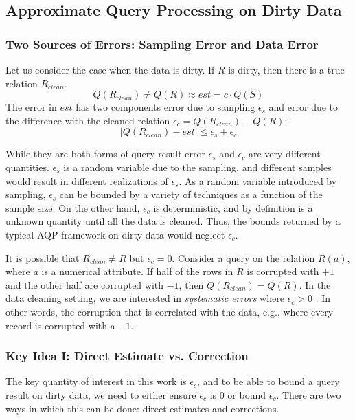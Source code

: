 \subsection{Approximate Query Processing on Dirty Data}


\subsubsection{Two Sources of Errors: Sampling Error and Data Error}
Let us consider the case when the data is dirty.
If $R$ is dirty, then there is a true relation $R_{clean}$.
\[
Q(R_{clean}) \ne Q(R) \approx est = c \cdot Q(S)
\]
The error in $est$ has two components error due to sampling $\epsilon_s$ and error due to the difference with the cleaned relation $\epsilon_c = Q(R_{clean}) - Q(R)$:
\[
\mid Q(R_{clean}) - est \mid \le \epsilon_s + \epsilon_c
\]

While they are both forms of query result error $\epsilon_s$ and $\epsilon_c$ are very different quantities.
$\epsilon_s$ is a random variable due to the sampling, and different samples would result in different realizations of $\epsilon_s$.
As a random variable introduced by sampling, $\epsilon_s$ can be bounded by a variety of techniques as a function of the sample size.
On the other hand, $\epsilon_c$ is deterministic, and by definition is a unknown quantity until all the data is cleaned.
Thus, the bounds returned by a typical AQP framework on dirty data would neglect $\epsilon_c$.

It is possible that $R_{clean} \ne R$ but $\epsilon_c=0$.
Consider a \sumfunc query on the relation $R(a)$, where $a$ is a numerical attribute.
If half of the rows in $R$ is corrupted with $+1$ and the other half are corrupted with $-1$, then $Q(R_{clean}) = Q(R)$.
In the data cleaning setting, we are interested in \emph{systematic errors} where $\epsilon_c > 0$ \cite{taylor1982introduction}. 
In other words, the corruption that is correlated with the data, e.g., where every record is corrupted with a $+1$.

\subsubsection{Key Idea I: Direct Estimate vs. Correction}
The key quantity of interest in this work is $\epsilon_c$, and to be able to bound
a query result on dirty data, we need to either ensure $\epsilon_c$ is 0 or bound $\epsilon_c$.
There are two ways in which this can be done: direct estimates and corrections.

